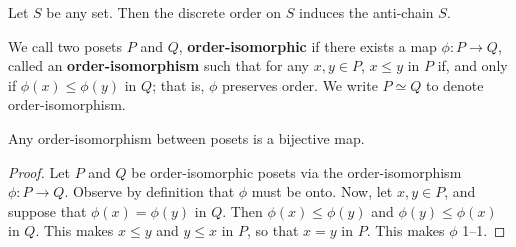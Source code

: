 \begin{proposition}\label{proposition_1.1.3}
  Let $S$ be any set. Then the discrete order on $S$ induces the
  anti-chain $S$.
\end{proposition}

\begin{definition}
  We call two posets $P$ and $Q$, \textbf{order-isomorphic} if there
  exists a map $\phi:P \xrightarrow{} Q$, called an
  \textbf{order-isomorphism} such that for any $x,y \in
  P$, $x \leq y$ in $P$ if, and only if  $\phi(x) \leq \phi(y)$ in
  $Q$; that is, $\phi$ preserves order. We write $P \simeq Q$ to denote
  order-isomorphism.
\end{definition}

\begin{proposition}\label{proposition_1.1.4}
  Any order-isomorphism between posets is a bijective map.
\end{proposition}
\begin{proof}
  Let $P$ and $Q$ be order-isomorphic posets via the order-isomorphism
  $\phi:P \xrightarrow{} Q$. Observe by definition that $\phi$ must be
  onto. Now, let $x,y \in P$, and suppose that $\phi(x)=\phi(y)$ in
  $Q$. Then  $\phi(x) \leq \phi(y)$ and $\phi(y) \leq \phi(x)$ in $Q$.
  This makes $x \leq y$ and $y \leq x$ in $P$, so that $x=y$ in  $P$.
  This makes $\phi$ 1--1.
\end{proof}

